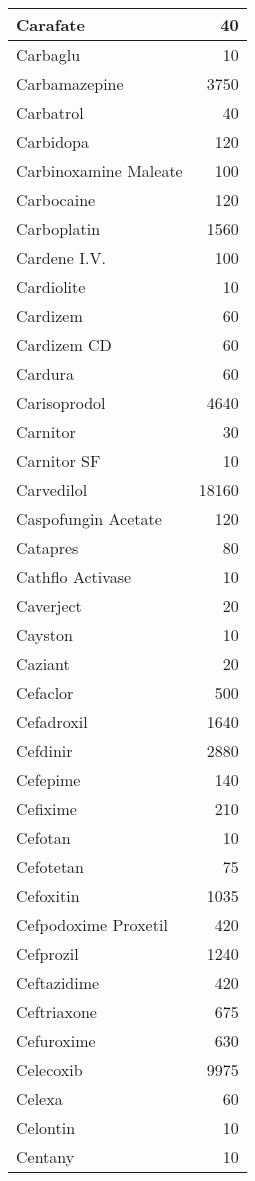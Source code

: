 \documentclass[
]{article}
\begin{document}
\begin{table}
\begin{tabular}[t]{l|r}
Carafate & 40\\
\hline
Carbaglu & 10\\
\hline
Carbamazepine & 3750\\
\hline
Carbatrol & 40\\
\hline
Carbidopa & 120\\
\hline
Carbinoxamine Maleate & 100\\
\hline
Carbocaine & 120\\
\hline
Carboplatin & 1560\\
\hline
Cardene I.V. & 100\\
\hline
Cardiolite & 10\\
\hline
Cardizem & 60\\
\hline
Cardizem CD & 60\\
\hline
Cardura & 60\\
\hline
Carisoprodol & 4640\\
\hline
Carnitor & 30\\
\hline
Carnitor SF & 10\\
\hline
Carvedilol & 18160\\
\hline
Caspofungin Acetate & 120\\
\hline
Catapres & 80\\
\hline
Cathflo Activase & 10\\
\hline
Caverject & 20\\
\hline
Cayston & 10\\
\hline
Caziant & 20\\
\hline
Cefaclor & 500\\
\hline
Cefadroxil & 1640\\
\hline
Cefdinir & 2880\\
\hline
Cefepime & 140\\
\hline
Cefixime & 210\\
\hline
Cefotan & 10\\
\hline
Cefotetan & 75\\
\hline
Cefoxitin & 1035\\
\hline
Cefpodoxime Proxetil & 420\\
\hline
Cefprozil & 1240\\
\hline
Ceftazidime & 420\\
\hline
Ceftriaxone & 675\\
\hline
Cefuroxime & 630\\
\hline
Celecoxib & 9975\\
\hline
Celexa & 60\\
\hline
Celontin & 10\\
\hline
Centany & 10\\

\end{tabular}
\end{table}
\end{document}
